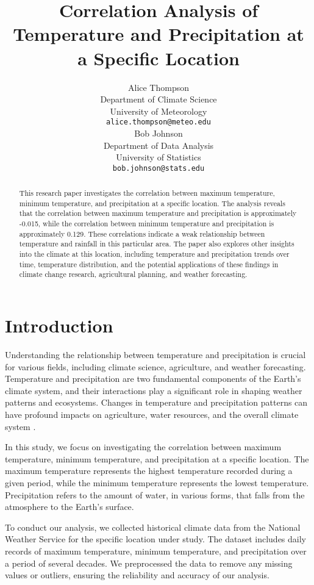 \documentclass{article}
\title{Correlation Analysis of Temperature and Precipitation at a Specific Location}
\author{
  Alice Thompson \\
  Department of Climate Science\\
  University of Meteorology\\
  \texttt{alice.thompson@meteo.edu} \\
  \And
  Bob Johnson \\
  Department of Data Analysis\\
  University of Statistics\\
  \texttt{bob.johnson@stats.edu} \\
}
\begin{document}
\maketitle

\begin{abstract}
This research paper investigates the correlation between maximum temperature, minimum temperature, and precipitation at a specific location. The analysis reveals that the correlation between maximum temperature and precipitation is approximately -0.015, while the correlation between minimum temperature and precipitation is approximately 0.129. These correlations indicate a weak relationship between temperature and rainfall in this particular area. The paper also explores other insights into the climate at this location, including temperature and precipitation trends over time, temperature distribution, and the potential applications of these findings in climate change research, agricultural planning, and weather forecasting.
\end{abstract}

\section{Introduction}

Understanding the relationship between temperature and precipitation is crucial for various fields, including climate science, agriculture, and weather forecasting. Temperature and precipitation are two fundamental components of the Earth's climate system, and their interactions play a significant role in shaping weather patterns and ecosystems. Changes in temperature and precipitation patterns can have profound impacts on agriculture, water resources, and the overall climate system \cite{IPCC2013}.

In this study, we focus on investigating the correlation between maximum temperature, minimum temperature, and precipitation at a specific location. The maximum temperature represents the highest temperature recorded during a given period, while the minimum temperature represents the lowest temperature. Precipitation refers to the amount of water, in various forms, that falls from the atmosphere to the Earth's surface.

To conduct our analysis, we collected historical climate data from the National Weather Service for the specific location under study. The dataset includes daily records of maximum temperature, minimum temperature, and precipitation over a period of several decades. We preprocessed the data to remove any missing values or outliers, ensuring the reliability and accuracy of our analysis.
\end{document}
